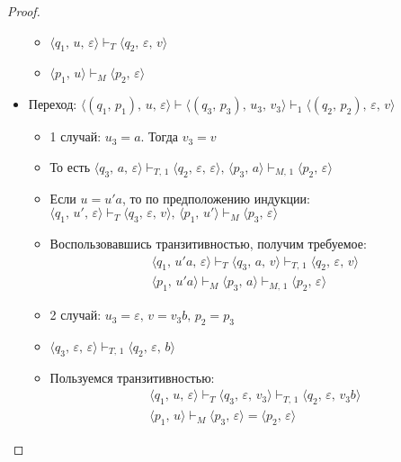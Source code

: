\documentclass[a4paper,12pt]{article}
\theoremstyle{plain}
\theoremstyle{definition}
\theoremstyle{remark}
\begin{document}
\begin{proof}
\begin{itemize}
\begin{itemize}
			      \item $\langle q_1,\,u,\,\varepsilon\rangle\vdash_T\langle q_2,\,\varepsilon,\,v\rangle$
			      \item $\langle p_1,\,u\rangle\vdash_M\langle p_2,\,\varepsilon\rangle$
		      \end{itemize}
		\item Переход: $\langle(q_1,\,p_1),\,u,\,\varepsilon\rangle\vdash\langle(q_3,\,p_3),\,u_3,\,v_3\rangle\vdash_1\langle(q_2,\,p_2),\,\varepsilon,\,v\rangle$
		      \begin{itemize}
			      \item 1 случай: $u_3 = a$. Тогда $v_3 = v$
			      \item То есть $\langle q_3,\,a,\,\varepsilon\rangle\vdash_{T,\,1}\langle q_2,\,\varepsilon,\,\varepsilon\rangle,\,\langle p_3,\,a\rangle\vdash_{M,\,1}\langle p_2,\,\varepsilon\rangle$
			      \item Если $u = u'a$, то по предположению индукции: $\langle q_1,\,u',\,\varepsilon\rangle\vdash_T\langle q_3,\,\varepsilon,\,v\rangle,\,\langle p_1,\,u'\rangle\vdash_M\langle p_3,\,\varepsilon\rangle$
			      \item Воспользовавшись транзитивностью, получим требуемое:
			            \begin{align*}
				            \langle q_1,\,u'a,\,\varepsilon\rangle\vdash_T\langle q_3,\,a,\,v\rangle\vdash_{T,\,1}\langle q_2,\,\varepsilon,\,v\rangle \\
				            \langle p_1,\,u'a\rangle\vdash_M\langle p_3,\,a\rangle\vdash_{M,\,1}\langle p_2,\,\varepsilon\rangle
			            \end{align*}
			      \item 2 случай: $u_3 = \varepsilon,\,v = v_3b,\, p_2 = p_3$
			      \item $\langle q_3,\,\varepsilon,\,\varepsilon\rangle\vdash_{T,\,1}\langle q_2,\,\varepsilon,\,b\rangle$
			      \item Пользуемся транзитивностью:
			            \begin{align*}
				            \langle q_1,\,u,\,\varepsilon\rangle\vdash_T\langle q_3,\,\varepsilon,\,v_3\rangle\vdash_{T,\,1}\langle q_2,\,\varepsilon,\, v_3b\rangle \\
				            \langle p_1,\,u\rangle\vdash_M\langle p_3,\,\varepsilon\rangle=\langle p_2,\,\varepsilon\rangle
			            \end{align*}
		      \end{itemize}
	\end{itemize}

\end{proof}
\end{document}
